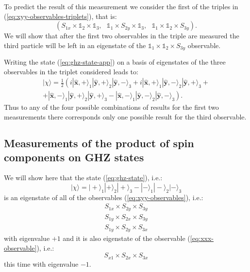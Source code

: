 To predict the result of this measurement we consider the first of the triples in (\ref{eq:xyy-observables-triplets}), that is:
\begin{equation*}
  \left( S_{1x} \times \mathbb{1}_2 \times \mathbb{1}_3,~~~ \mathbb{1}_1 \times S_{2y} \times \mathbb{1}_3,~~~ \mathbb{1}_1 \times \mathbb{1}_2 \times S_{3y} \right).
\end{equation*}
We will show that after the first two observables in the triple are measured the third particle will be left in an eigenstate of the $\mathbb{1}_1 \times \mathbb{1}_2 \times S_{3y}$ observable.

Writing the state (\ref{eq:ghz-state-app}) on a basis of eigenstates of the three observables in the triplet considered leads to:
\begin{equation*}
  \begin{split}
    |\chi\rangle = \frac{1}{2} \left( i |\mathbf{\hat{x}}, +\rangle_1 |\mathbf{\hat{y}}, +\rangle_2 |\mathbf{\hat{y}}, -\rangle_3 + i |\mathbf{\hat{x}}, +\rangle_1 |\mathbf{\hat{y}}, -\rangle_2 |\mathbf{\hat{y}}, +\rangle_3 +\right.\\
    \left. + |\mathbf{\hat{x}}, -\rangle_1 |\mathbf{\hat{y}}, +\rangle_2 |\mathbf{\hat{y}}, +\rangle_3 - |\mathbf{\hat{x}}, -\rangle_1 |\mathbf{\hat{y}}, -\rangle_2 |\mathbf{\hat{y}}, -\rangle_3 \right).
  \end{split}
\end{equation*}
Thus to any of the four possible combinations of results for the first two measurements there corresponds only one possible result for the third observable.

\subsection{Measurements of the product of spin components on GHZ states}
We will show here that the state (\ref{eq:ghz-state}), i.e.:
\begin{equation*}
  |\chi\rangle = |+\rangle_1 |+\rangle_2 |+\rangle_3 - |-\rangle_1 |-\rangle_2 |-\rangle_3
\end{equation*}
is an eigenstate of all of the observables (\ref{eq:xyy-observables}), i.e.:
\begin{equation}
  \begin{split}
    S_{1x} \times S_{2y} \times S_{3y}\\
    S_{1y} \times S_{2x} \times S_{3y}\\
    S_{1y} \times S_{2y} \times S_{3x}
  \end{split}
  \label{eq:xyy-operators-app}
\end{equation}
with eigenvalue $+ 1$ and it is also eigenstate of the observable (\ref{eq:xxx-observable}), i.e.:
\begin{equation*}
  S_{x1} \times S_{2x} \times S_{3x}
\end{equation*}
this time with eigenvalue $- 1$.

